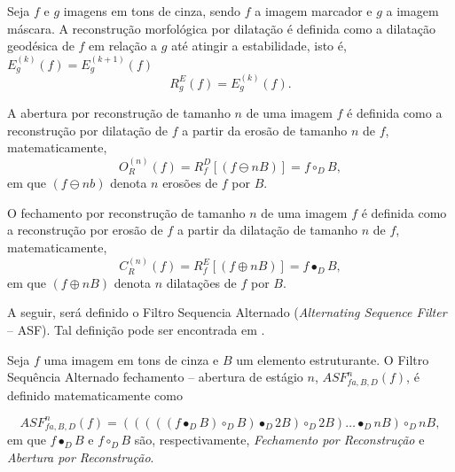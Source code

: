 \begin{define}
	Seja $f$ e $g$ imagens em tons de cinza, sendo $f$ a imagem marcador e $g$ a imagem máscara. A reconstrução morfológica por dilatação é definida como a dilatação geodésica de $f$ em relação a $g$ até atingir a estabilidade, isto é, $E_{g}^{(k)}(f) = E_{g}^{(k+1)}(f)$
	\begin{equation}
		R_{g}^{E}(f) = E_{g}^{(k)}(f).
	\end{equation}
\end{define}

\begin{define}
	A abertura por reconstrução de tamanho $n$ de uma imagem $f$ é definida como a reconstrução por dilatação de $f$ a partir da erosão de tamanho $n$ de $f$, matematicamente,
	\begin{equation}
		O^{(n)}_{R}(f) = R^{D}_{f}[(f \ominus nB)] = f \circ_D B,
	\end{equation}
	em que $(f \ominus nb)$ denota $n$ erosões de $f$ por $B$. 
\end{define}

\begin{define}
	O fechamento por reconstrução de tamanho $n$ de uma imagem $f$ é definida como a reconstrução por erosão de $f$ a partir da dilatação de tamanho $n$ de $f$, matematicamente,
	\begin{equation}
		C^{(n)}_{R}(f) = R^{E}_{f}[(f \oplus nB)] = f \bullet_D B,
	\end{equation}
	em que $(f \oplus nB)$ denota $n$ dilatações de $f$ por $B$.
\end{define}

A seguir, será definido o Filtro Sequencia Alternado (\textit{Alternating Sequence Filter} – ASF). Tal definição pode ser encontrada em \cite{dougherty2003hands}.

\begin{define}
	Seja $f$ uma imagem em tons de cinza e $B$ um elemento estruturante. O Filtro Sequência Alternado fechamento -- abertura de estágio $n$, $ASF^{n}_{fa,B,D}(f)$, é definido matematicamente como
	
	\begin{equation}
		ASF^{n}_{fa,B,D}(f) = (((((f \bullet_D B) \circ_D B) \bullet_D 2B) \circ_D 2B) \dots \bullet_D nB) \circ_D nB,
	\end{equation}
	em que $f \bullet_D B$ e $f \circ_D B$ são, respectivamente, \textit{Fechamento por Reconstrução} e \textit{Abertura por Reconstrução}.
\end{define}

